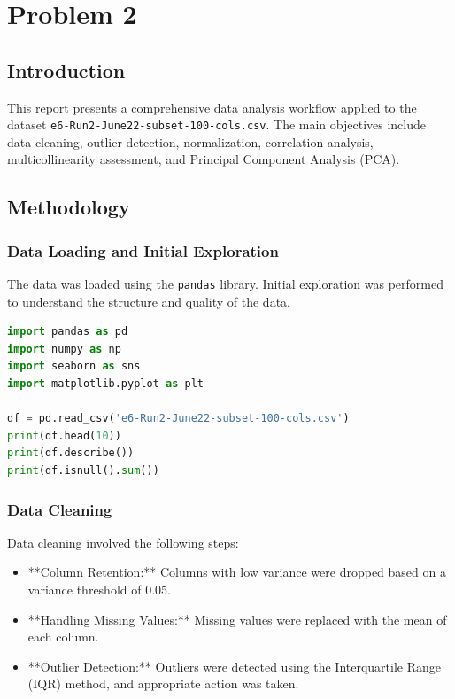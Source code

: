 \section{Problem 2}

\subsection{Introduction}

This report presents a comprehensive data analysis workflow applied to the dataset \texttt{e6-Run2-June22-subset-100-cols.csv}. The main objectives include data cleaning, outlier detection, normalization, correlation analysis, multicollinearity assessment, and Principal Component Analysis (PCA).

\subsection{Methodology}

\subsubsection{Data Loading and Initial Exploration}
The data was loaded using the \texttt{pandas} library. Initial exploration was performed to understand the structure and quality of the data.

\begin{lstlisting}[language=Python]
import pandas as pd
import numpy as np
import seaborn as sns
import matplotlib.pyplot as plt

df = pd.read_csv('e6-Run2-June22-subset-100-cols.csv')
print(df.head(10))
print(df.describe())
print(df.isnull().sum())
\end{lstlisting}

\subsubsection{Data Cleaning}
Data cleaning involved the following steps:

\begin{itemize}
    \item **Column Retention:** Columns with low variance were dropped based on a variance threshold of 0.05.
    \item **Handling Missing Values:** Missing values were replaced with the mean of each column.
    \item **Outlier Detection:** Outliers were detected using the Interquartile Range (IQR) method, and appropriate action was taken.
\end{itemize}

